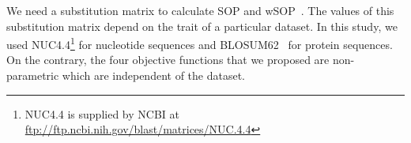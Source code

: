 \begin{comment}
So, in this study we work run our optimization algorithm with these set of objective function:

\begin{itemize}
	\item \{Gap, SOP\}
	
	\item \{SOP, TC\}
	
	\item \{wSOP, TC\}
	
	\item \{Gap, SOP, wSOP, TC\}
	\item \{Entropy, TC, Gap, SimG, SimNG, GapCon\}
	\item \{SimG, SimNG\}
\end{itemize}
\end{comment}

We need a substitution matrix to calculate SOP and wSOP~\citep{durbin1998biological}. The values of this substitution matrix depend on the trait of a particular dataset. In this study, we used NUC4.4\footnote[1]{NUC4.4 is supplied by NCBI at \url{ftp://ftp.ncbi.nih.gov/blast/matrices/NUC.4.4}} for nucleotide sequences and BLOSUM62~\citep{henikoff1992amino} for protein sequences. On the contrary, the four objective functions that we proposed are non-parametric which are independent of the dataset.

